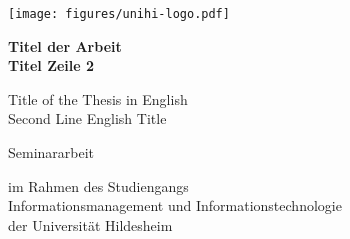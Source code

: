 \documentclass[12pt,        %
  english,ngerman,          %
  paper=a4,                 %
  captions=tablesignature,  %
  listof=numbered,          %
  bibliography=totoc,       %
  headings=small,           %
  headinclude=false,        %
  footinclude=false,        %
  parskip=half-,            %
  oneside,                  %
  DIV=12                    %
  ]{scrbook}                %
\begin{document}
\frontmatter



\begin{titlepage}
  \begin{center}
    \texttt{[image: figures/unihi-logo.pdf]}\\

    \vfill

    {
      \Large
      \bfseries
      Titel der Arbeit\\    
      Titel Zeile 2
      
      \vspace{0.25cm}
      \normalsize
      \mdseries
        Title of the Thesis in English\\
        Second Line English Title
    }

    \vfill

    {
      \normalsize

      Seminararbeit

      im Rahmen des Studiengangs\\
      Informationsmanagement und Informationstechnologie\\
      der Universität Hildesheim

      \vfill

}
\end{center}
\end{titlepage}
\end{document}
